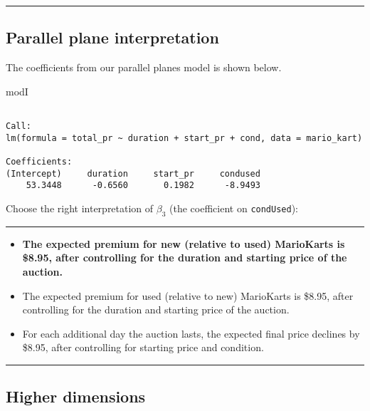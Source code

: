 \documentclass[
]{book}
\newenvironment{Shaded}{\begin{snugshade}}{\end{snugshade}}
\newcommand{\NormalTok}[1]{#1}
\begin{document}
\begin{center}\rule{0.5\linewidth}{0.5pt}\end{center}

\hypertarget{parallel-plane-interpretation}{%
\subsection*{Parallel plane interpretation}\label{parallel-plane-interpretation}}

The coefficients from our parallel planes model is shown below.

\begin{Shaded}
\begin{Highlighting}[]
\NormalTok{modI}
\end{Highlighting}
\end{Shaded}

\begin{verbatim}

Call:
lm(formula = total_pr ~ duration + start_pr + cond, data = mario_kart)

Coefficients:
(Intercept)     duration     start_pr     condused  
    53.3448      -0.6560       0.1982      -8.9493  
\end{verbatim}

Choose the right interpretation of \(\beta_3\) (the coefficient on \texttt{condUsed}):

\begin{center}\rule{0.5\linewidth}{0.5pt}\end{center}

\begin{itemize}
\item
  \textbf{The expected premium for new (relative to used) MarioKarts is \$8.95, after controlling for the duration and starting price of the auction.}
\item
  The expected premium for used (relative to new) MarioKarts is \$8.95, after controlling for the duration and starting price of the auction.
\item
  For each additional day the auction lasts, the expected final price declines by \$8.95, after controlling for starting price and condition.
\end{itemize}

\begin{center}\rule{0.5\linewidth}{0.5pt}\end{center}

\hypertarget{higher-dimensions}{%
\subsection*{Higher dimensions}\label{higher-dimensions}}
\end{document}
